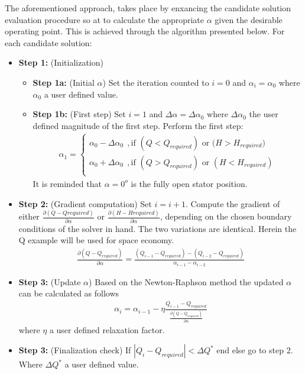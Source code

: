 The aforementioned approach, takes place by enxancing the candidate solution evaluation procedure so at to calculate the appropriate $\alpha$ given the desirable operating point. This is achieved through the algorithm presented below. 
\newpage
For each candidate solution:
\begin{itemize}
\item[]{\bf Step 1:}  (Initialization) 
\begin{itemize}
	\item[]{\bf Step 1a:} (Initial $\alpha$) Set the iteration counted to $i=0$ and $\alpha_i=\alpha _0$ where $\alpha _0$ a user defined value.
	\item[]{\bf Step 1b:} (First step) Set $i=1$ and $\Delta \alpha= \Delta \alpha_0$ where $\Delta \alpha_0$ the user defined magnitude of the first step. Perform the first step:
\begin{eqnarray}
	\alpha_1={\left\{ 
	\begin{array}{ll}
    \alpha_0 - \Delta \alpha_0 ~~,\mbox{if $(Q < Q_{required})$ or ($H > H_{required})$}\\
	\alpha_0 + \Delta \alpha_0 ~~,\mbox{if $(Q > Q_{required})$ or $(H < H_{required})$}\\
    \end{array} \right. }
    \label{step0}
\end{eqnarray}  
It is reminded that $\alpha=0^o$ is the fully open stator position.
\end{itemize}

\item[]{\bf Step 2:}  (Gradient computation) Set $i=i+1$. Compute the gradient of either $\frac{\partial(Q-Q{required})}{\partial \alpha}$ or $\frac{\partial(H-H{required})}{\partial \alpha}$, depending on the chosen boundary conditions of the solver in hand. The two variations are identical. Herein the Q example will be used for space economy. 
\begin{eqnarray}
	\frac{\partial(Q-Q_{required})}{\partial \alpha}=\frac{(Q_{i-1}-Q_{required})-(Q_{i-2}-Q_{required})}{\alpha_{i-1}- \alpha_{i-2}}
\end{eqnarray}  

\item[]{\bf Step 3:}  (Update $\alpha$) Based on the Newton-Raphson method the updated $\alpha$ can be calculated as follows
\begin{eqnarray}
	\alpha_{i}=\alpha_{i-1} - \eta \frac{Q_{i-1}-Q_{required}} {\frac{\partial(Q-Q_{required})}{\partial \alpha}}  
\end{eqnarray}  
where $\eta$ a user defined relaxation factor. 

\item[]{\bf Step 3:} (Finalization check) If $|Q_{i}-Q_{required}|<\Delta Q^*$ end else go to step 2. Where $\Delta Q^*$ a user defined value.
\end{itemize}  

